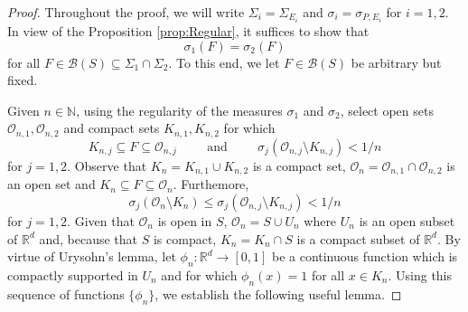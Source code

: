 \documentclass[11pt]{article}
\begin{document}
\begin{proof}
Throughout the proof, we will write $\Sigma_i=\Sigma_{E_i}$ and $\sigma_i=\sigma_{P,E_i}$ for $i=1,2$. In view of the Proposition \ref{prop:Regular}, it suffices to show that 
\begin{equation*}
\sigma_1(F)=\sigma_2(F)
\end{equation*}
for all $F\in \mathcal{B}(S)\subseteq \Sigma_{1}\cap\Sigma_{2}$. To this end, we let $F\in\mathcal{B}(S)$ be arbitrary but fixed. 

Given $n\in\mathbb{N}$, using the regularity of the measures $\sigma_1$ and $\sigma_2$, select open sets $\mathcal{O}_{n,1},\mathcal{O}_{n,2}$ and compact sets $K_{n,1},K_{n,2}$ for which
\begin{equation*}
K_{n,j}\subseteq F\subseteq \mathcal{O}_{n,j}\hspace{1cm}\mbox{and}\hspace{1cm}\sigma_j(\mathcal{O}_{n,j}\setminus K_{n,j})<1/n
\end{equation*}
for $j=1,2$. Observe that $K_n=K_{n,1}\cup K_{n,2}$ is a compact set, $\mathcal{O}_n=\mathcal{O}_{n,1}\cap\mathcal{O}_{n,2}$ is an open set and $K_n\subseteq F\subseteq \mathcal{O}_n$. Furthemore, 
\begin{equation*}
\sigma_j(\mathcal{O}_n\setminus K_n)\leq \sigma_j(\mathcal{O}_{n,j}\setminus K_{n,j})<1/n
\end{equation*}
for $j=1,2$. Given that $\mathcal{O}_n$ is open in $S$, $\mathcal{O}_n=S\cup U_n$ where $U_n$ is an open subset of $\mathbb{R}^d$ and, because that $S$ is compact, $K_n=K_n\cap S$ is a compact subset of $\mathbb{R}^d$. By virtue of Urysohn's lemma, let $\phi_n:\mathbb{R}^d\to [0,1]$ be a continuous function which is compactly supported in $U_n$ and for which $\phi_n(x)=1$ for all $x\in K_n$. Using this sequence of functions $\{\phi_n\}$, we establish the following useful lemma.


\end{proof}
\end{document}
